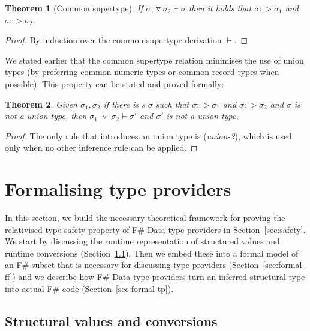 \documentclass[preprint]{sigplanconf}
\newcommand{\tsep}[0]{\; \triangledown \;}
\newtheorem{theorem}{Theorem}
\begin{document}
\begin{theorem}[Common supertype]
\raggedright
If $\sigma_1 \triangledown \sigma_2 \vdash \sigma$ then it holds that $\sigma :> \sigma_1$ and $\sigma :> \sigma_2$.
\end{theorem}
\begin{proof}
By induction over the common supertype derivation $\vdash$.
\end{proof}

\noindent
We stated earlier that the common supertype relation minimises the use of union types 
(by preferring common numeric types or common record types when possible). This property
can be stated and proved formally:
%
\begin{theorem}
\label{thm:no-unions}
Given $\sigma_1, \sigma_2$ if there is s $\sigma$ such that $\sigma :> \sigma_1$ and 
$\sigma :> \sigma_2$ and $\sigma$ is not a union type, then $\sigma_1 \tsep \sigma_2 \vdash \sigma'$ 
and $\sigma'$ is not a union type.
\end{theorem}
\begin{proof}
The only rule that introduces an union type is (\emph{union-3}), which is used only when 
no other inference rule can be applied.
\end{proof}


\section{Formalising type providers}
\label{sec:formal}

In this section, we build the necessary theoretical framework for proving the relativised type safety 
property of F\# Data type providers in Section~\ref{sec:safety}. We start by discussing the runtime 
representation of structured values and runtime conversions (Section~\ref{sec:formal-convert}). Then 
we embed these into a formal model of an F\# subset that is necessary for discussing type providers 
(Section~\ref{sec:formal-ff}) and we describe how F\# Data type providers turn an inferred 
structural type into actual F\# code (Section~\ref{sec:formal-tp}).


\subsection{Structural values and conversions}
\label{sec:formal-convert}
\end{document}

